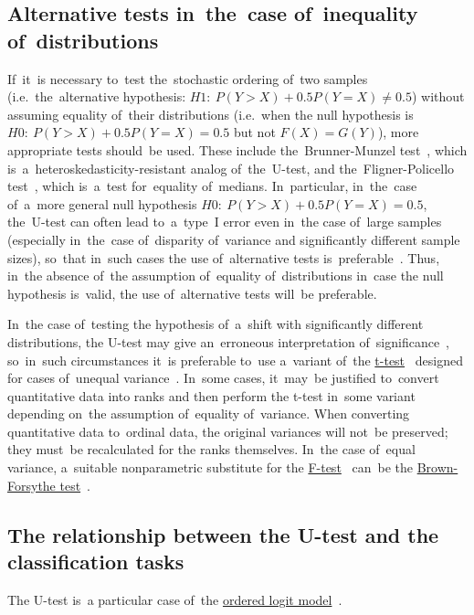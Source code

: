\documentclass[]{scrreprt}
\begin{document}
\subsection{Alternative tests in~the~case of~inequality of~distributions}
If~it~is necessary to~test the~stochastic ordering of~two samples (i.e.~the~alternative hypothesis: $H1:\ P(Y>X)+0.5P(Y=X)\neq0.5$) without assuming equality of~their distributions (i.e.~when the null hypothesis is~$H0:\ P(Y>X)+0.5P(Y=X)=0.5$ but not $F(X)=G(Y)$), more appropriate tests should~be used. These include the~Brunner-Munzel test~\cite{Bruner-Munzel-test-1}, which is~a~heteroskedasticity-resistant analog of~the~U-test, and the~Fligner-Policello test~\cite{Fligner-Policello-test}, which is~a~test for~equality of~medians. In~particular, in~the~case of~a~more general null hypothesis $H0:\ P(Y>X)+0.5P(Y=X)=0.5$, the~U-test can often lead to~a~type~I error even in~the case of~large samples (especially in~the~case of~disparity of~variance and significantly different sample sizes), so~that in~such cases the use of~alternative tests is~preferable~\cite{U-test-vs-Bruner-Munzel-test}. Thus, in~the absence of~the assumption of~equality of~distributions in~case the null hypothesis is~valid, the use of~alternative tests will~be preferable.

In~the case of~testing the hypothesis of~a~shift with significantly different distributions, the U-test may give an~erroneous interpretation of~significance~\cite{U-test-unequal-variance}, so~in~such circumstances it~is preferable to~use a~variant of~the \href{https://en.wikipedia.org/wiki/Welch's_t-test}{t-test}~\cite{Welch-t-test} designed for cases of~unequal variance~\cite{U-test-unequal-variance}. In~some cases, it~may~be justified to~convert quantitative data into ranks and then perform the t-test in~some variant depending on~the assumption of~equality of~variance. When converting quantitative data to~ordinal data, the original variances will not~be preserved; they must~be recalculated for the ranks themselves. In~the case of~equal variance, a~suitable nonparametric substitute for the \href{https://en.wikipedia.org/wiki/F-test}{F-test}~\cite{F-test} can~be the \href{https://en.wikipedia.org/wiki/Brown-Forsythe_test}{Brown-Forsythe test}~\cite{Brown-Forsythe-test}.
%
\subsection{The relationship between the U-test and the classification tasks}\label{U-test&classification}
The U-test is~a particular case of~the \href{https://en.wikipedia.org/wiki/Ordered_logit}{ordered logit model}~\cite{Ordered-logit}.
%
\end{document}
